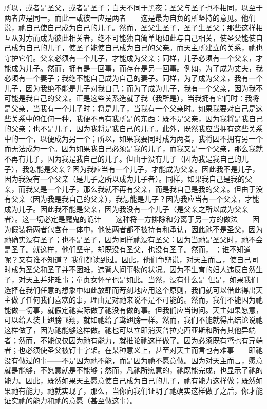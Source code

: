 所以，或者是圣父，或者是圣子；白天不同于黑夜；圣父与圣子也不相同，以至于两者应是同一，而此一或彼一应是两者——这是最为自负的所坚持的意见。他们说，祂自己使自己成为自己的儿子。然而，圣父生圣子，圣子生圣父；那些这样相互从对方而成为彼此相关者，绝不可能独自简单地如此与自己相关，使圣父能使自己成为自己的儿子，使圣子能使自己成为自己的父亲。而天主所建立的关系，祂也守护它们。父亲必须有一个儿子，才能成为父亲；同样，儿子必须有一个父亲，才能成为儿子。然而，拥有是一回事，而存在是另一回事。例如，为了成为丈夫，我必须有一个妻子；我绝不能自己成为自己的妻子。同样，为了成为父亲，我有一个儿子，因为我绝不能是儿子对我自己；而为了成为儿子，我有一个父亲，因为我不可能是我自己的父亲。正是这些关系造就了我（我所是），当我拥有它们时：我将是父亲，当我有一个儿子时；将是儿子，当我有一个父亲时。如果我要对自己是这些关系中的任何一种，我便不再有我所是的东西：既不是父亲，因为我将是我自己的父亲；也不是儿子，因为我将是我自己的儿子。此外，既然我应当拥有这些关系中的一个，以便成为另一个；所以，如果我要同时成为两者，我将因不拥有另一个而无法成为一个。因为如果我自己必须是我的儿子，而我又是一个父亲，那么我就不再有儿子，因为我是我自己的儿子。但由于没有儿子（因为我是我自己的儿子），我怎能是父亲？因为我应当有一个儿子，才能成为父亲。因此我不是儿子，因为我没有一个父亲（是儿子之所以成为儿子者）。同样，如果我自己是我的父亲，而我又是一个儿子，那么我就不再有父亲，而是我自己是我的父亲。但由于没有父亲（因为我是我自己的父亲），我怎能是儿子？因为我应当有一个父亲，才能成为儿子。因此我不能是父亲，因为我没有一个儿子（是父亲之所以成为父亲者）。这一切必定是魔鬼的诡计——这种将一方排除和分离于另一方的做法——因为假装将两者包含在一体中，他使两者都不被持有和承认，因此祂不是圣父，因为祂确实没有圣子；也不是圣子，因为同样祂没有圣父：因为当祂是圣父时，祂不会是圣子。就这样，他们坚守，却既没有圣父，也没有圣子。然而， ；谁不知道呢？又有谁不知道？ 我们都读到过。因此，他们争辩说，对天主而言，使自己同时成为圣父和圣子并不困难，违背人间事物的状况。因为不生育的妇人违反自然生子，对天主并非难事；童贞女怀孕也是如此。当然，没有什么是 但是，如果我们选择在我们任意的想象中如此放肆而苛刻地应用这个原则，我们就可以借此得出天主做了任何我们喜欢的事，理由是对祂来说不是不可能的。然而，我们不能因为祂能做一切事，就假定祂实际做了祂没有做的事。但我们应当询问。天主如果愿意，可以给人装上翅膀飞翔，就如祂给了鸢翅膀一样。然而，我们不能就得出结论说祂这样做了，因为祂能够这样做。祂也可以立即消灭普拉克西亚斯和所有其他异端者；然而，不能仅仅因为祂有能力，就推论祂这样做了。因为必须既有鸢也有异端者；也必须使圣父被钉十字架。在某种意义上，甚至对天主而言也有难事——即祂没有做过的事——不是因为祂不能，而是因为祂不愿意做。因为对天主而言，愿意就是能够，不愿意就是不能够；然而，凡祂所愿意的，祂既能完成，也显示了祂的能力。因此，既然如果天主愿意使自己成为自己的儿子，祂有能力这样做；既然如果祂有能力，祂就实现了，那么，当你向我们证明了祂确实这样做了之后，你才能证实祂的能力和祂的意愿（甚至做这事）。\par

